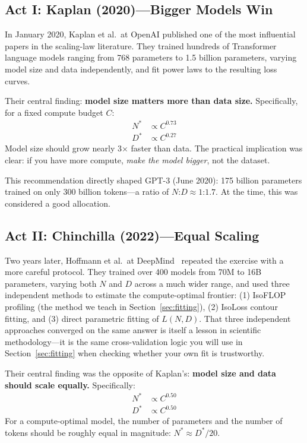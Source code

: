 \subsection{Act I: Kaplan (2020)---Bigger Models Win}
\label{sec:kaplan}

In January 2020, Kaplan et al.\ at OpenAI published one of the most influential papers in the scaling-law literature. They trained hundreds of Transformer language models ranging from 768 parameters to 1.5 billion parameters, varying model size and data independently, and fit power laws to the resulting loss curves.

Their central finding: \textbf{model size matters more than data size.} Specifically, for a fixed compute budget $C$:
\begin{align}
N^* &\propto C^{0.73} \\
D^* &\propto C^{0.27}
\end{align}
Model size should grow nearly 3$\times$ faster than data. The practical implication was clear: if you have more compute, \emph{make the model bigger}, not the dataset.

This recommendation directly shaped GPT-3 (June 2020): 175 billion parameters trained on only 300 billion tokens---a ratio of $N$:$D \approx 1$:$1.7$. At the time, this was considered a good allocation.


\subsection{Act II: Chinchilla (2022)---Equal Scaling}
\label{sec:chinchilla}

Two years later, Hoffmann et al.\ at DeepMind~\cite{hoffmann2022training} repeated the exercise with a more careful protocol. They trained over 400 models from 70M to 16B parameters, varying both $N$ and $D$ across a much wider range, and used three independent methods to estimate the compute-optimal frontier: (1) IsoFLOP profiling (the method we teach in Section~\ref{sec:fitting}), (2) IsoLoss contour fitting, and (3) direct parametric fitting of $L(N, D)$. That three independent approaches converged on the same answer is itself a lesson in scientific methodology---it is the same cross-validation logic you will use in Section~\ref{sec:fitting} when checking whether your own fit is trustworthy.

Their central finding was the opposite of Kaplan's: \textbf{model size and data should scale equally.} Specifically:
\begin{align}
N^* &\propto C^{0.50} \\
D^* &\propto C^{0.50}
\end{align}
For a compute-optimal model, the number of parameters and the number of tokens should be roughly equal in magnitude: $N^* \approx D^*/20$.

